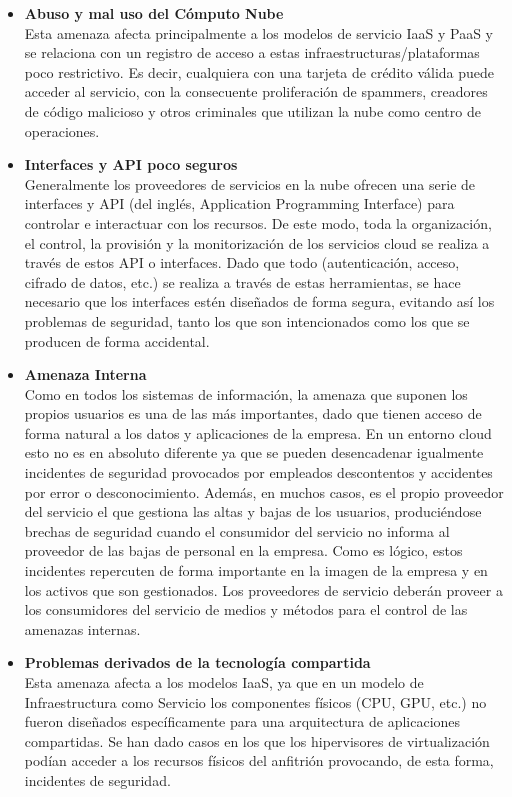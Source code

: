 \begin{itemize}
	\item \textbf {Abuso y mal uso del Cómputo Nube} \\ Esta amenaza afecta principalmente a los modelos de servicio IaaS y PaaS y se relaciona con un registro de acceso a estas infraestructuras/plataformas poco restrictivo. Es decir, cualquiera con una tarjeta de crédito válida puede acceder al servicio, con la consecuente proliferación de spammers, creadores de código malicioso y otros criminales que utilizan la nube como centro de operaciones. 
	\item \textbf {Interfaces y API poco seguros} \\ Generalmente los proveedores de servicios en la nube ofrecen una serie de interfaces y API (del inglés, Application Programming Interface) para controlar e interactuar con los recursos. De este modo, toda la organización, el control, la provisión y la monitorización de los servicios cloud se realiza a través de estos API o interfaces. 
Dado que todo (autenticación, acceso, cifrado de datos, etc.) se realiza a través de estas herramientas, se hace necesario que los interfaces estén diseñados de forma segura, evitando así los problemas de seguridad, tanto los que son intencionados como los que se producen de forma accidental. 
	\item \textbf {Amenaza Interna} \\ Como en todos los sistemas de información, la amenaza que suponen los propios usuarios es una de las más importantes, dado que tienen acceso de forma natural a los datos y aplicaciones de la empresa. En un entorno cloud esto no es en absoluto diferente ya que se pueden desencadenar igualmente incidentes de seguridad provocados por empleados descontentos y accidentes por error o desconocimiento. 
Además, en muchos casos, es el propio proveedor del servicio el que gestiona las altas y bajas de los usuarios, produciéndose brechas de seguridad cuando el consumidor del servicio no informa al proveedor de las bajas de personal en la empresa. 
Como es lógico, estos incidentes repercuten de forma importante en la imagen de la empresa y en los activos que son gestionados. 
Los proveedores de servicio deberán proveer a los consumidores del servicio de medios y métodos para el control de las amenazas internas.
	\item \textbf {Problemas derivados de la tecnología compartida} \\  Esta amenaza afecta a los modelos IaaS, ya que en un modelo de Infraestructura como Servicio los componentes físicos (CPU, GPU, etc.) no fueron diseñados específicamente para una arquitectura de aplicaciones compartidas. Se han dado casos en los que los hipervisores de virtualización podían acceder a los recursos físicos del anfitrión provocando, de esta forma, incidentes de seguridad. 

\end{itemize}
